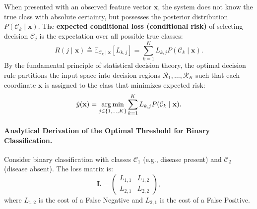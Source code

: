 When presented with an observed feature vector $\mathbf{x}$, the system does not know the true class with absolute certainty, but possesses the posterior distribution $P(\mathcal{C}_k \mid \mathbf{x})$. The \textbf{expected conditional loss (conditional risk)} of selecting decision $\mathcal{C}_j$ is the expectation over all possible true classes:
\begin{equation}
R(j \mid \mathbf{x}) \triangleq \mathbb{E}_{\mathcal{C}_k \mid \mathbf{x}}\left[ L_{k, j} \right] = \sum_{k=1}^K L_{k, j} P(\mathcal{C}_k \mid \mathbf{x}).
\label{eq:conditional_risk_general}
\end{equation}
By the fundamental principle of statistical decision theory, the optimal decision rule partitions the input space into decision regions $\mathcal{R}_1, \dots, \mathcal{R}_K$ such that each coordinate $\mathbf{x}$ is assigned to the class that minimizes expected risk:
\begin{equation}
\hat{y}(\mathbf{x}) = \operatorname*{arg\,min}_{j \in \{1, \dots, K\}} \sum_{k=1}^K L_{k, j} P(\mathcal{C}_k \mid \mathbf{x}).
\label{eq:optimal_decision_rule_loss_matrix}
\end{equation}

\paragraph{Analytical Derivation of the Optimal Threshold for Binary Classification.}
Consider binary classification with classes $\mathcal{C}_1$ (e.g., disease present) and $\mathcal{C}_2$ (disease absent). The loss matrix is:
\begin{equation}
\mathbf{L} = \begin{pmatrix} L_{1, 1} & L_{1, 2} \\ L_{2, 1} & L_{2, 2} \end{pmatrix},
\end{equation}
where $L_{1, 2}$ is the cost of a False Negative and $L_{2, 1}$ is the cost of a False Positive.

